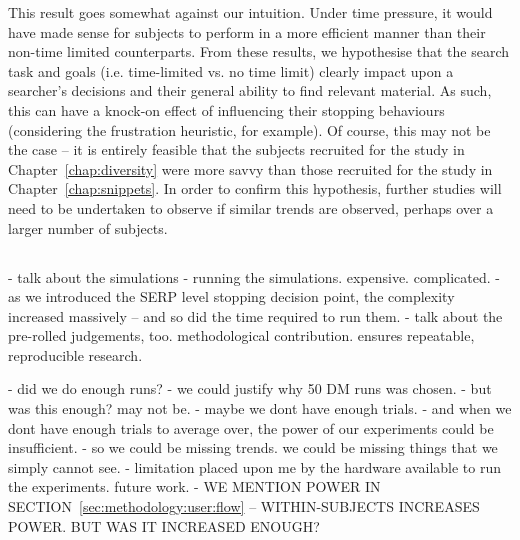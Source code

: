 This result goes somewhat against our intuition. Under time pressure, it would have made sense for subjects to perform in a more efficient manner than their non-time limited counterparts. From these results, we hypothesise that the search task and goals (i.e. time-limited vs. no time limit) clearly impact upon a searcher's decisions and their general ability to find relevant material. As such, this can have a knock-on effect of influencing their stopping behaviours (considering the frustration heuristic, for example). Of course, this may not be the case -- it is entirely feasible that the subjects recruited for the study in Chapter~\ref{chap:diversity} were more savvy than those recruited for the study in Chapter~\ref{chap:snippets}. In order to confirm this hypothesis, further studies will need to be undertaken to observe if similar trends are observed, perhaps over a larger number of subjects.

%

\subsection{}

- talk about the simulations
    - running the simulations. expensive. complicated.
    - as we introduced the SERP level stopping decision point, the complexity increased massively -- and so did the time required to run them.
    - talk about the pre-rolled judgements, too. methodological contribution. ensures repeatable, reproducible research.

- did we do enough runs?
    - we could justify why 50 DM runs was chosen.
    - but was this enough? may not be.
    - maybe we dont have enough trials.
    - and when we dont have enough trials to average over, the power of our experiments could be insufficient.
        - so we could be missing trends. we could be missing things that we simply cannot see.
        - limitation placed upon me by the hardware available to run the experiments. future work.
        - WE MENTION POWER IN SECTION~\ref{sec:methodology:user:flow} -- WITHIN-SUBJECTS INCREASES POWER. BUT WAS IT INCREASED ENOUGH?

